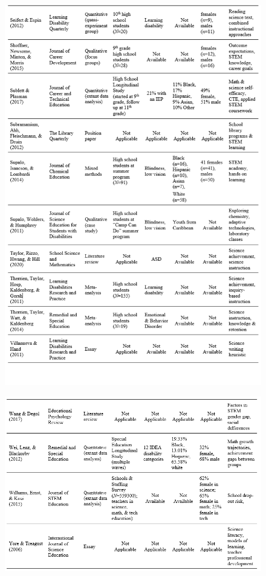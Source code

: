 \documentclass[11pt]{sig-alternate}
\begin{document}
\begin{large}
\begin{figure}[htp]
    \includegraphics[width=14cm]{Table1e.png}
\end{figure}
\newpage

\newpage
\newpage
\pagebreak
\clearpage
\begin{figure}[htp]

    \includegraphics[width=14cm]{Table1f.png}
\end{figure}
\newpage
\end{large}
\end{document}
